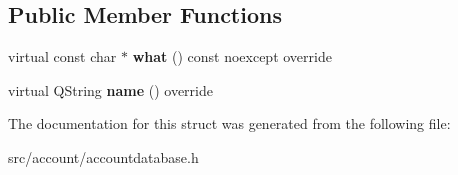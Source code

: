 \subsection*{Public Member Functions}
\begin{DoxyCompactItemize}
\item 
\mbox{\label{structInterfaceAccountDatabase_1_1AccountExistsException_a0ef320378d8fca372095b5251717434b}} 
virtual const char $\ast$ {\bfseries what} () const noexcept override
\item 
\mbox{\label{structInterfaceAccountDatabase_1_1AccountExistsException_a24b1fb2147c44dabf801eb30087137d7}} 
virtual Q\+String {\bfseries name} () override
\end{DoxyCompactItemize}


The documentation for this struct was generated from the following file\+:\begin{DoxyCompactItemize}
\item 
src/account/accountdatabase.\+h\end{DoxyCompactItemize}
